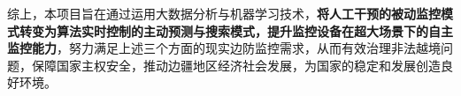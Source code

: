 综上，本项目旨在通过运用大数据分析与机器学习技术，\textbf{将人工干预的被动监控模式转变为算法实时控制的主动预测与搜索模式，提升监控设备在超大场景下的自主监控能力}，努力满足上述三个方面的现实边防监控需求，从而有效治理非法越境问题，保障国家主权安全，推动边疆地区经济社会发展，为国家的稳定和发展创造良好环境。



























